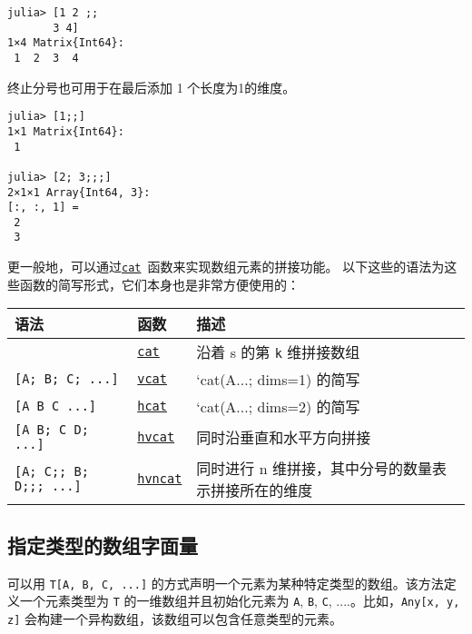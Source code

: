 \begin{verbatim}
julia> [1 2 ;;
       3 4]
1×4 Matrix{Int64}:
 1  2  3  4
\end{verbatim}



终止分号也可用于在最后添加 1 个长度为1的维度。




\begin{verbatim}
julia> [1;;]
1×1 Matrix{Int64}:
 1

julia> [2; 3;;;]
2×1×1 Array{Int64, 3}:
[:, :, 1] =
 2
 3
\end{verbatim}



更一般地，可以通过\hyperlink{9868138443525443234}{\texttt{cat}} 函数来实现数组元素的拼接功能。 以下这些的语法为这些函数的简写形式，它们本身也是非常方便使用的：




\begin{table}[h]

\begin{tabulary}{\linewidth}{|L|L|L|}
\hline
语法 & 函数 & 描述 \\
\hline
 & \hyperlink{9868138443525443234}{\texttt{cat}} & 沿着 s 的第 \texttt{k} 维拼接数组 \\
\hline
\texttt{[A; B; C; ...]} & \hyperlink{14691815416955507876}{\texttt{vcat}} & `cat(A...; dims=1) 的简写 \\
\hline
\texttt{[A B C ...]} & \hyperlink{8862791894748483563}{\texttt{hcat}} & `cat(A...; dims=2) 的简写 \\
\hline
\texttt{[A B; C D; ...]} & \hyperlink{16279083053557795116}{\texttt{hvcat}} & 同时沿垂直和水平方向拼接 \\
\hline
\texttt{[A; C;; B; D;;; ...]} & \href{@ref}{\texttt{hvncat}} & 同时进行 n 维拼接，其中分号的数量表示拼接所在的维度 \\
\hline
\end{tabulary}

\end{table}



\hypertarget{6678793664119592343}{}


\subsection{指定类型的数组字面量}



可以用 \texttt{T[A, B, C, ...]} 的方式声明一个元素为某种特定类型的数组。该方法定义一个元素类型为 \texttt{T} 的一维数组并且初始化元素为 \texttt{A}, \texttt{B}, \texttt{C}, ....。比如，\texttt{Any[x, y, z]} 会构建一个异构数组，该数组可以包含任意类型的元素。



